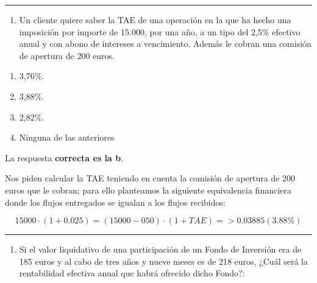 \documentclass[
  letterpaper,
  DIV=11,
  numbers=noendperiod]{scrreprt}
\providecommand{\tightlist}{%
  \setlength{\itemsep}{0pt}\setlength{\parskip}{0pt}}\usepackage{longtable,booktabs,array}
\begin{document}
\begin{center}\rule{0.5\linewidth}{0.5pt}\end{center}

\begin{enumerate}
\def\labelenumi{\arabic{enumi}.}
\setcounter{enumi}{77}
\tightlist
\item
  Un cliente quiere saber la TAE de una operación en la que ha hecho una
  imposición por importe de 15.000, por una año, a un tipo del 2,5\%
  efectivo anual y con abono de intereses a vencimiento. Además le
  cobran una comisión de apertura de 200 euros.
\end{enumerate}

\begin{enumerate}
\def\labelenumi{\alph{enumi}.}
\item
  3,76\%.
\item
  3,88\%.
\item
  2,82\%.
\item
  Ninguna de las anteriores
\end{enumerate}

\begin{tcolorbox}[enhanced jigsaw, left=2mm, opacityback=0, colback=white, breakable, arc=.35mm, bottomrule=.15mm, rightrule=.15mm, toprule=.15mm, leftrule=.75mm, colframe=quarto-callout-tip-color-frame]
\begin{minipage}[t]{5.5mm}
\textcolor{quarto-callout-tip-color}{\faLightbulb}
\end{minipage}%
\begin{minipage}[t]{\textwidth - 5.5mm}

La respuesta \textbf{correcta es la b}.

Nos piden calcular la TAE teniendo en cuenta la comisión de apertura de
200 euros que le cobran; para ello planteamos la siguiente equivalencia
financiera donde los flujos entregados se igualan a los flujos
recibidos:

\[15000\cdot\left(1+0.025\right)=\left(15000-050\right)\cdot\left(1+TAE\right)=>0.03885(3.88\%)\]

\end{minipage}%
\end{tcolorbox}

\begin{center}\rule{0.5\linewidth}{0.5pt}\end{center}

\begin{enumerate}
\def\labelenumi{\arabic{enumi}.}
\setcounter{enumi}{78}
\tightlist
\item
  Si el valor liquidativo de una participación de un Fondo de Inversión
  era de 185 euros y al cabo de tres años y nueve meses es de 218 euros,
  ¿Cuál será la rentabilidad efectiva anual que habrá ofrecido dicho
  Fondo?:
\end{enumerate}
\end{document}
